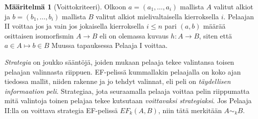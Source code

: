 \documentclass[finnish]{tktltiki2}
\theoremstyle{definition}
\newtheorem{maar}[lau]{Määritelmä}
\theoremstyle{remark}
\begin{document}
\begin{maar}[Voittokriteeri]
Olkoon $a = (a_1, \ldots, a_i)$ mallista $A$ valitut alkiot ja $b = (b_1, \ldots, b_i)$ mallista $B$ valitut alkiot mielivaltaisella kierroksella $i$. Pelaajan II voittaa jos ja vain jos jokaisella kierroksella $i \leq n$ pari $(a, b)$ määrää osittaisen isomorfismin $A \rightarrow B$ eli on olemassa kuvaus $h: A \rightarrow B$, siten että $a \in A \mapsto b \in B$ Muussa tapauksessa Pelaaja I voittaa.
\end{maar}

\textit{Strategia} on joukko sääntöjä, joiden mukaan pelaaja tekee valintansa toisen pelaajan valinnasta riippuen. EF-pelissä kummallakin pelaajalla on koko ajan tiedossa mallit, niiden rakenne ja jo tehdyt valinnat, eli peli on \textit{täydellisen informaation peli}. Strategiaa, jota seuraamalla pelaaja voittaa pelin riippumatta mitä valintoja toinen pelajaa tekee kutsutaan \textit{voittavaksi strategiaksi}. Jos Pelaaja II:lla on voittava strategia EF-pelissä $EF_k(A, B)$, niin tätä merkitään $A \sim_k B$.
\end{document}
